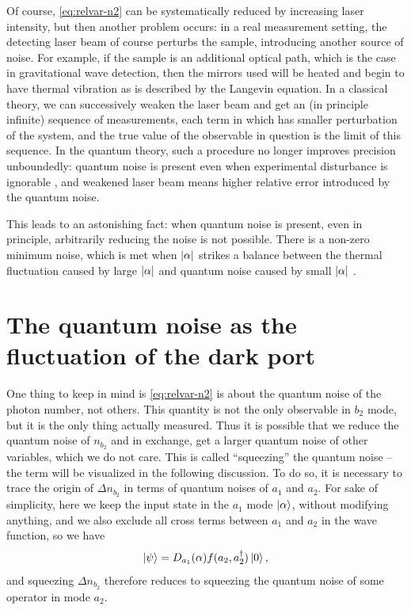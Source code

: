 \documentclass[hyperref, a4paper]{article}
\begin{document}
Of course, \eqref{eq:relvar-n2} can be systematically reduced by increasing laser intensity,
but then another problem occurs:
in a real measurement setting,
the detecting laser beam of course perturbs the sample,
introducing another source of noise.
For example, if the sample is an additional optical path,
which is the case in gravitational wave detection,
then the mirrors used will be heated
and begin to have thermal vibration as is described by the Langevin equation.
In a classical theory,
we can successively weaken the laser beam 
and get an (in principle infinite) sequence of measurements,
each term in which has smaller perturbation of the system,
and the true value of the observable in question is the limit of this sequence.
In the quantum theory,
such a procedure no longer improves precision unboundedly:
quantum noise is present even when experimental disturbance is ignorable \cite{scully_quantum_1991},  
and weakened laser beam means higher relative error 
introduced by the quantum noise.

This leads to an astonishing fact:
when quantum noise is present, 
even in principle, 
arbitrarily reducing the noise is not possible.
There is a non-zero minimum noise,
which is met when $\abs{\alpha}$ strikes a balance 
between the thermal fluctuation caused by large $\abs{\alpha}$
and quantum noise caused by small $\abs{\alpha}$ \cite{caves_quantum-mechanical_1981}.


\section{The quantum noise as the fluctuation of the dark port}\label{sec:dark-port-analysis}

One thing to keep in mind is \eqref{eq:relvar-n2} 
is about the quantum noise of the photon number, not others.
This quantity is not the only observable in $b_2$ mode,
but it is the only thing actually measured.
Thus it is possible that we reduce the quantum noise of $n_{b_2}$
and in exchange, get a larger quantum noise of other variables,
which we do not care.
This is called ``squeezing'' the quantum noise
-- the term will be visualized in the following discussion.
To do so, it is necessary to trace the origin of $\Delta{n_{b_2}}$ 
in terms of quantum noises of $a_1$ and $a_2$. 
For sake of simplicity,
here we keep the input state in the $a_1$ mode $\ket{\alpha}$,
without modifying anything,
and we also exclude all cross terms between $a_1$ and $a_2$ in the wave function, 
so we have 
\begin{equation}
    \ket{\psi} = D_{a_1}(\alpha) f(a_2, a_2^\dagger) \ket{0},
    \label{eq:coherent-plus-squeeze}
\end{equation}
and squeezing $\Delta{n_{b_2}}$ therefore reduces to squeezing the quantum noise of some operator in mode $a_2$.
\end{document}
